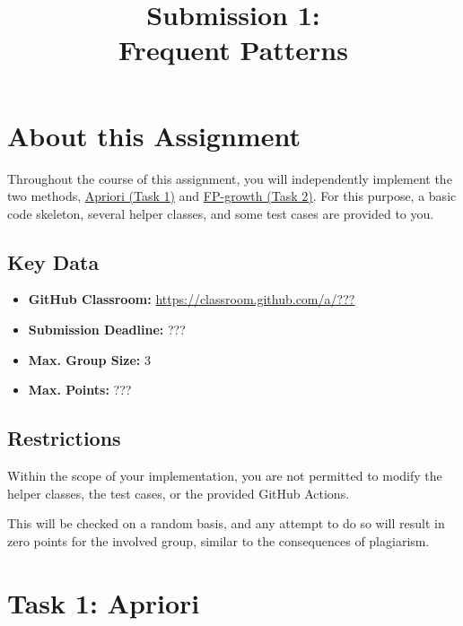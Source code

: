 \documentclass[
english,
smallborders
]{i6prcsht}
\begin{document}
\title{Submission 1: \\ Frequent Patterns}
\maketitle
\vspace*{-2cm}

\section*{About this Assignment}

Throughout the course of this assignment, you will independently implement the two methods, \hyperref[sec:task-one]{Apriori (Task 1)} and \hyperref[sec:task-one]{FP-growth (Task 2)}. For this purpose, a basic code skeleton, several helper classes, and some test cases are provided to you.

\subsection*{Key Data}

\begin{itemize}
	\item \textbf{GitHub Classroom:} \url{https://classroom.github.com/a/???}
	\item \textbf{Submission Deadline:} ???
	\item \textbf{Max. Group Size:} 3
	\item \textbf{Max. Points:} ???
\end{itemize}

\subsection*{Restrictions}

Within the scope of your implementation, you are not permitted to modify the helper classes, the test cases, or the provided GitHub Actions.

This will be checked on a random basis, and any attempt to do so will result in zero points for the involved group, similar to the consequences of plagiarism.

\newpage

\section*{Task 1: Apriori}
\label{sec:task-one}
\end{document}
